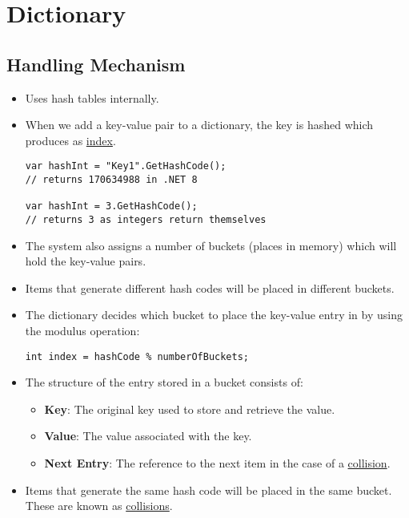 \chapter{Dictionary}


\section{Handling Mechanism}
	\begin{itemize}
		\item Uses hash tables internally.
		\item When we add a key-value pair to a dictionary, the key is hashed which produces as \underline{index}.
			\begin{lstlisting}
var hashInt = "Key1".GetHashCode();
// returns 170634988 in .NET 8

var hashInt = 3.GetHashCode();
// returns 3 as integers return themselves
			\end{lstlisting}
		\item The system also assigns a number of buckets (places in memory) which will hold the key-value pairs.
		\item Items that generate different hash codes will be placed in different buckets.
		\item The dictionary decides which bucket to place the key-value entry in by using the modulus operation:
			\begin{lstlisting}
int index = hashCode % numberOfBuckets;
			\end{lstlisting}
		\item The structure of the entry stored in a bucket consists of:
		\begin{itemize}
			\item \textbf{Key}: The original key used to store and retrieve the value.
			\item \textbf{Value}: The value associated with the key.
			\item \textbf{Next Entry}: The reference to the next item in the case of a \underline{collision}.
		\end{itemize}
		\item Items that generate the same hash code will be placed in the same bucket. These are known as \underline{collisions}.
	\end{itemize}

